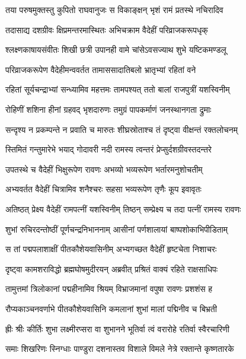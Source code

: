 
\twolineshloka
{तया परुषमुक्तस्तु कुपितो राघवानुजः}
{स विकाङ्क्षन् भृशं रामं प्रतस्थे नचिरादिव} %

\twolineshloka
{तदासाद्य दशग्रीवः क्षिप्रमन्तरमास्थितः}
{अभिचक्राम वैदेहीं परिव्राजकरूपधृक्} %

\twolineshloka
{श्लक्ष्णकाषायसंवीतः शिखी छत्री उपानही}
{वामे चांसेऽवसज्याथ शुभे यष्टिकमण्डलू} %

\twolineshloka
{परिव्राजकरूपेण वैदेहीमन्ववर्तत}
{तामाससादातिबलो भ्रातृभ्यां रहितां वने} %

\twolineshloka
{रहितां सूर्यचन्द्राभ्यां सन्ध्यामिव महत्तमः}
{तामपश्यत् ततो बालां राजपुत्रीं यशस्विनीम्} %

\twolineshloka
{रोहिणीं शशिना हीनां ग्रहवद् भृशदारुणः}
{तमुग्रं पापकर्माणं जनस्थानगता द्रुमाः} %

\twolineshloka
{सन्दृश्य न प्रकम्पन्ते न प्रवाति च मारुतः}
{शीघ्रस्रोताश्च तं दृष्ट्वा वीक्षन्तं रक्तलोचनम्} %

\twolineshloka
{स्तिमितं गन्तुमारेभे भयाद् गोदावरी नदी}
{रामस्य त्वन्तरं प्रेप्सुर्दशग्रीवस्तदन्तरे} %

\twolineshloka
{उपतस्थे च वैदेहीं भिक्षुरूपेण रावणः}
{अभव्यो भव्यरूपेण भर्तारमनुशोचतीम्} %

\twolineshloka
{अभ्यवर्तत वैदेहीं चित्रामिव शनैश्चरः}
{सहसा भव्यरूपेण तृणैः कूप इवावृतः} %

\twolineshloka
{अतिष्ठत् प्रेक्ष्य वैदेहीं रामपत्नीं यशस्विनीम्}
{तिष्ठन् सम्प्रेक्ष्य च तदा पत्नीं रामस्य रावणः} %

\twolineshloka
{शुभां रुचिरदन्तोष्ठीं पूर्णचन्द्रनिभाननाम्}
{आसीनां पर्णशालायां बाष्पशोकाभिपीडिताम्} %

\twolineshloka
{स तां पद्मपलाशाक्षीं पीतकौशेयवासिनीम्}
{अभ्यगच्छत वैदेहीं हृष्टचेता निशाचरः} %

\twolineshloka
{दृष्ट्वा कामशराविद्धो ब्रह्मघोषमुदीरयन्}
{अब्रवीत् प्रश्रितं वाक्यं रहिते राक्षसाधिपः} %

\twolineshloka
{तामुत्तमां त्रिलोकानां पद्महीनामिव श्रियम्}
{विभ्राजमानां वपुषा रावणः प्रशशंस ह} %

\twolineshloka
{रौप्यकाञ्चनवर्णाभे पीतकौशेयवासिनि}
{कमलानां शुभां मालां पद्मिनीव च बिभ्रती} %

\twolineshloka
{ह्रीः श्रीः कीर्तिः शुभा लक्ष्मीरप्सरा वा शुभानने}
{भूतिर्वा त्वं वरारोहे रतिर्वा स्वैरचारिणी} %

\twolineshloka
{समाः शिखरिणः स्निग्धाः पाण्डुरा दशनास्तव}
{विशाले विमले नेत्रे रक्तान्ते कृष्णतारके} %

